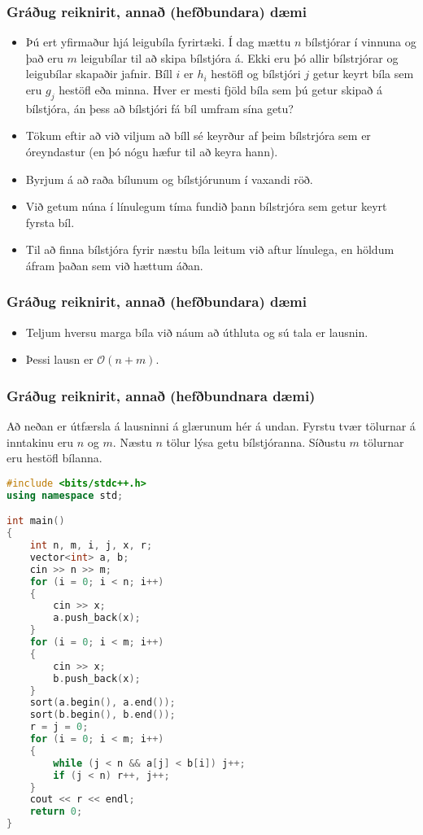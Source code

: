 \documentclass{beamer}
\renewcommand\O{\mathcal{O}}
\begin{document}
\begin{frame}
	\frametitle{Gráðug reiknirit, annað (hefðbundara) dæmi}
\begin{itemize}
	\item<1-> 
		Þú ert yfirmaður hjá leigubíla fyrirtæki.
		Í dag mættu $n$ bílstjórar í vinnuna og það eru $m$ leigubílar til að skipa bílstjóra á.
		Ekki eru þó allir bílstrjórar og leigubílar skapaðir jafnir.
		Bíll $i$ er $h_i$ hestöfl og bílstjóri $j$ getur keyrt bíla sem eru $g_j$ hestöfl eða minna.
		Hver er mesti fjöld bíla sem þú getur skipað á bílstjóra, án þess að bílstjóri fá bíl umfram sína getu?
	\item<2->  Tökum eftir að við viljum að bíll sé keyrður af þeim bílstrjóra sem er óreyndastur (en þó nógu hæfur til að keyra hann).
	\item<3->  Byrjum á að raða bílunum og bílstjórunum í vaxandi röð.
	\item<4->  Við getum núna í línulegum tíma fundið þann bílstrjóra sem getur keyrt fyrsta bíl.
	\item<5->  Til að finna bílstjóra fyrir næstu bíla leitum við aftur línulega, en höldum áfram þaðan sem við hættum áðan.
\end{itemize}
\end{frame}

\begin{frame}
	\frametitle{Gráðug reiknirit, annað (hefðbundara) dæmi}
\begin{itemize}
	\item<1-> Teljum hversu marga bíla við náum að úthluta og sú tala er lausnin.
	\item<2-> Þessi lausn er $\O(n + m)$.
\end{itemize}
\end{frame}

\begin{frame}[fragile]
	\frametitle{Gráðug reiknirit, annað (hefðbundnara dæmi)}
\tiny
Að neðan er útfærsla á lausninni á glærunum hér á undan. Fyrstu tvær tölurnar á inntakinu eru $n$ og $m$. 
Næstu $n$ tölur lýsa getu bílstjóranna.
Síðustu $m$ tölurnar eru hestöfl bílanna.
\begin{lstlisting}[language=C++]
#include <bits/stdc++.h>
using namespace std;

int main()
{
	int n, m, i, j, x, r;
	vector<int> a, b;
	cin >> n >> m;
	for (i = 0; i < n; i++)
	{
		cin >> x;
		a.push_back(x);
	}
	for (i = 0; i < m; i++)
	{
		cin >> x;
		b.push_back(x);
	}
	sort(a.begin(), a.end());
	sort(b.begin(), b.end());
	r = j = 0;
	for (i = 0; i < m; i++)
	{
		while (j < n && a[j] < b[i]) j++;
		if (j < n) r++, j++;
	}
	cout << r << endl;
	return 0;
}
\end{lstlisting}
\end{frame}
\end{document}
